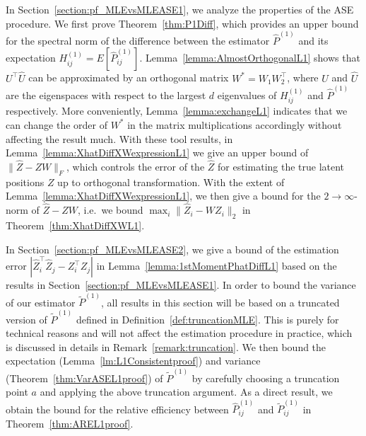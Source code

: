 In Section~\ref{section:pf_MLEvsMLEASE1}, we analyze the properties of the ASE procedure. We first prove Theorem~\ref{thm:P1Diff}, which provides an upper bound for the spectral norm of the difference between the estimator $\hat{P}^{(1)}$ and its expectation $H_{ij}^{(1)} = E[\hat{P}_{ij}^{(1)}]$. Lemma~\ref{lemma:AlmostOrthogonalL1} shows that $U^{\top} \hat{U}$ can be approximated by an orthogonal matrix $W^{*} = W_1 W_2^{\top}$, where $U$ and $\hat{U}$ are the eigenspaces with respect to the largest $d$ eigenvalues of $H_{ij}^{(1)}$ and $\hat{P}^{(1)}$ respectively. More conveniently, Lemma~\ref{lemma:exchangeL1} indicates that we can change the order of $W^*$ in the matrix multiplications accordingly without affecting the result much. With these tool results, in Lemma~\ref{lemma:XhatDiffXWexpressionL1} we give an upper bound of $\|\hat{Z} - Z W\|_F$, which controls the error of the $\hat{Z}$ for estimating the true latent positions $Z$ up to orthogonal transformation.
With the extent of Lemma~\ref{lemma:XhatDiffXWexpressionL1}, we then give a bound for the $2 \to \infty$-norm of $\hat{Z} - Z W$, i.e.\ we bound $\max_i \| \hat{Z}_i - W Z_i \|_2$ in Theorem~\ref{thm:XhatDiffXWL1}.

In Section~\ref{section:pf_MLEvsMLEASE2}, we give a bound of the estimation error $\left|  \hat{Z}_i^{\top} \hat{Z}_j - Z_i^{\top} Z_j \right|$ in Lemma~\ref{lemma:1stMomentPhatDiffL1} based on the results in Section~\ref{section:pf_MLEvsMLEASE1}. In order to bound the variance of our estimator $\widetilde{P}^{(1)}$, all results in this section will be based on a truncated version of $\widetilde{P}^{(1)}$ defined in Definition~\ref{def:truncationMLE}. This is purely for technical reasons and will not affect the estimation procedure in practice, which is discussed in details in Remark~\ref{remark:truncation}. We then bound the expectation (Lemma~\ref{lm:L1Consistentproof}) and variance (Theorem~\ref{thm:VarASEL1proof}) of $\widetilde{P}^{(1)}$ by carefully choosing a truncation point $a$ and applying the above truncation argument. As a direct result, we obtain the bound for the relative efficiency between $\hat{P}_{ij}^{(1)}$ and $\widetilde{P}_{ij}^{(1)}$ in Theorem~\ref{thm:AREL1proof}.

